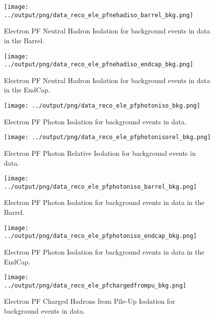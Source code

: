 \documentclass[11pt]{book}
\begin{document}
\begin{figure}[htb]
\centering
\texttt{[image: ../output/png/data\_reco\_ele\_pfnehadiso\_barrel\_bkg.png]}
\caption{Electron PF Neutral Hadron Isolation for background events in data in the Barrel.}
\label{fig:data_ele_pfnehadiso_barrel_bkg}
\end{figure}

\begin{figure}[htb]
\centering
\texttt{[image: ../output/png/data\_reco\_ele\_pfnehadiso\_endcap\_bkg.png]}
\caption{Electron PF Neutral Hadron Isolation for background events in data in the EndCap.}
\label{fig:data_ele_pfnehadiso_endcap_bkg}
\end{figure}

\begin{figure}[htb]
\centering
\texttt{[image: ../output/png/data\_reco\_ele\_pfphotoniso\_bkg.png]}
\caption{Electron PF Photon Isolation for background events in data.}
\label{fig:data_ele_pfphotoniso_bkg}
\end{figure}

\begin{figure}[htb]
\centering
\texttt{[image: ../output/png/data\_reco\_ele\_pfphotonisorel\_bkg.png]}
\caption{Electron PF Photon Relative Isolation for background events in data.}
\label{fig:data_ele_pfphotonisorel_bkg}
\end{figure}

\begin{figure}[htb]
\centering
\texttt{[image: ../output/png/data\_reco\_ele\_pfphotoniso\_barrel\_bkg.png]}
\caption{Electron PF Photon Isolation for background events in data in the Barrel.}
\label{fig:data_ele_pfphotoniso_barrel_bkg}
\end{figure}

\begin{figure}[htb]
\centering
\texttt{[image: ../output/png/data\_reco\_ele\_pfphotoniso\_endcap\_bkg.png]}
\caption{Electron PF Photon Isolation for background events in data in the EndCap.}
\label{fig:data_ele_pfphotoniso_endcap_bkg}
\end{figure}


\begin{figure}[htb]
\centering
\texttt{[image: ../output/png/data\_reco\_ele\_pfchargedfrompu\_bkg.png]}
\caption{Electron PF Charged Hadrons from Pile-Up Isolation for background events in data.}
\label{fig:data_ele_pfchargedfrompu_bkg}
\end{figure}
\end{document}
